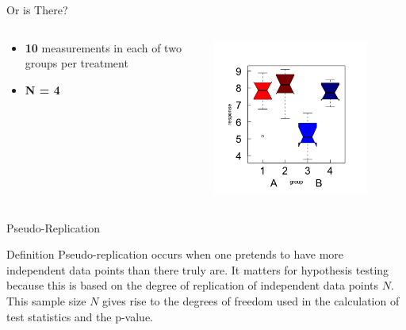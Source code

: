 \documentclass{beamer}
\begin{document}
\begin{frame}{Or is There?}


  \begin{columns}[onlytextwidth] %
    \begin{column}{0.44\textwidth}
  \begin{itemize}
    \item \textbf{10} measurements in each of two groups per treatment
    \item \textbf{N = 4}
  \end{itemize}
    \end{column}
    \hspace{0.02\textwidth} %
    \begin{column}{0.6\textwidth}
      \begin{center}
        \includegraphics[width=0.8\textwidth]{lectures/day_1_intro_to_mems/figures/unnamed-chunk-7-1.png}
      \end{center}
    \end{column}
  \end{columns}

    

\end{frame}

\begin{frame}{Pseudo-Replication}
  \begin{block}{Definition}
    Pseudo-replication occurs when one pretends to have more independent data points than there truly are. It matters for hypothesis testing because this is based on the degree of replication of independent data points \(N\). This sample size \(N\) gives rise to the degrees of freedom used in the calculation of test statistics and the p-value.
  \end{block}
\end{frame}
\end{document}
